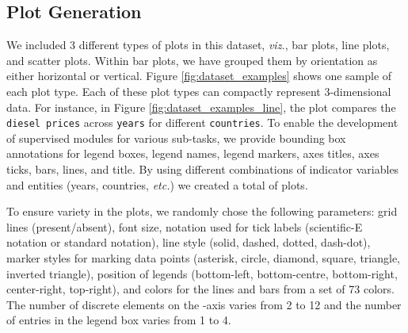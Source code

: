 \documentclass[10pt,twocolumn,letterpaper]{article}
\begin{document}
\subsection{Plot Generation}
We included 3 different types of plots in this dataset, \textit{viz.}, bar plots, line plots, and scatter plots.
Within bar plots, we have grouped them by orientation as either horizontal or vertical. 
Figure \ref{fig:dataset_examples} shows one sample of each plot type. 
Each of these plot types can compactly represent 3-dimensional data. 
For instance, in Figure \ref{fig:dataset_examples_line}, the plot compares the \texttt{diesel prices} across \texttt{years} for different \texttt{countries}. 
To enable the development of supervised modules for various sub-tasks, we provide bounding box annotations for legend boxes, legend names, legend markers, axes titles, axes ticks, bars, lines, and title. 
By using different combinations of indicator variables and entities (years, countries, \textit{etc.}) we created a total of  plots. 

To ensure variety in the plots, we randomly chose the following parameters: grid lines (present/absent), font size, notation used for tick labels (scientific-E notation or standard notation), line style (solid, dashed, dotted, dash-dot), marker styles for marking data points (asterisk, circle, diamond, square, triangle, inverted triangle), position of legends (bottom-left, bottom-centre, bottom-right, center-right, top-right), and colors for the lines and bars from a set of 73 colors. 
The number of discrete elements on the -axis varies from 2 to 12 and the number of entries in the legend box varies from 1 to 4. 
\end{document}
